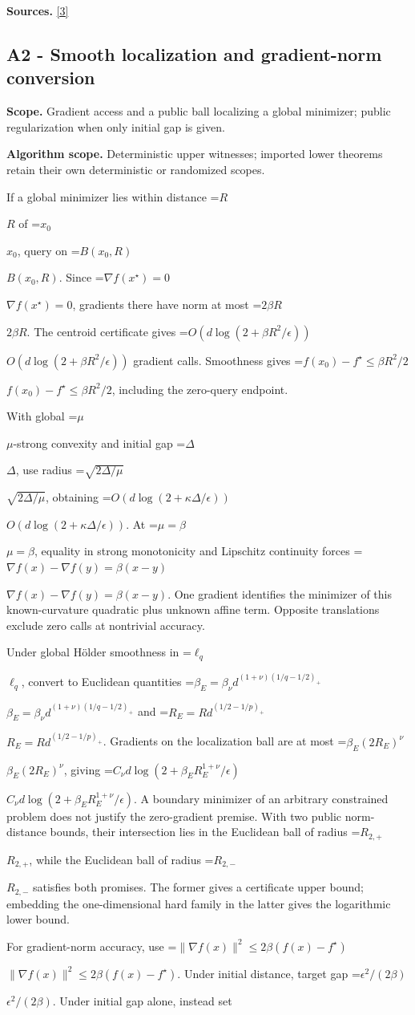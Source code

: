 \documentclass[10pt,a4paper]{article}
\newcommand{\AtlasMath}[1]{\par\begingroup\centering\setbox0=\hbox{$\displaystyle #1$}\ifdim\wd0>1.4\linewidth\typeout{ATLAS WIDE FORMULA: \the\wd0}\fi\ifdim\wd0>\linewidth\resizebox{\linewidth}{!}{\box0}\else\box0\fi\par\endgroup}
\newcommand{\AtlasInlineMath}[1]{\begingroup\setbox0=\hbox{$#1$}\ifdim\wd0>.4\linewidth\endgroup\AtlasMath{#1}\else\endgroup$#1$\fi}
\begin{document}
\textbf{Sources.} \href{https://arxiv.org/pdf/1405.4980}{[3]}

\subsection{A2 - Smooth localization and gradient-norm conversion}
\textbf{Scope.} Gradient access and a public ball localizing a global minimizer; public regularization when only initial gap is given.

\textbf{Algorithm scope.} Deterministic upper witnesses; imported lower theorems retain their own deterministic or randomized scopes.

If a global minimizer lies within distance \AtlasInlineMath{R} of \AtlasInlineMath{x_0}, query on \AtlasInlineMath{B(x_0,R)}. Since \AtlasInlineMath{\nabla f(x^\star)=0}, gradients there have norm at most \AtlasInlineMath{2\beta R}. The centroid certificate gives \AtlasInlineMath{O(d\log(2+\beta R^2/\epsilon))} gradient calls. Smoothness gives \AtlasInlineMath{f(x_0)-f^\star\le\beta R^2/2}, including the zero-query endpoint.

With global \AtlasInlineMath{\mu}-strong convexity and initial gap \AtlasInlineMath{\Delta}, use radius \AtlasInlineMath{\sqrt{2\Delta/\mu}}, obtaining \AtlasInlineMath{O(d\log(2+\kappa\Delta/\epsilon))}. At \AtlasInlineMath{\mu=\beta}, equality in strong monotonicity and Lipschitz continuity forces \AtlasInlineMath{\nabla f(x)-\nabla f(y)=\beta(x-y)}. One gradient identifies the minimizer of this known-curvature quadratic plus unknown affine term. Opposite translations exclude zero calls at nontrivial accuracy.

Under global Hölder smoothness in \AtlasInlineMath{\ell_q}, convert to Euclidean quantities
\AtlasInlineMath{\beta_E=\beta_\nu d^{(1+\nu)(1/q-1/2)_+}} and
\AtlasInlineMath{R_E=Rd^{(1/2-1/p)_+}}. Gradients on the localization ball are at most \AtlasInlineMath{\beta_E(2R_E)^\nu}, giving
\AtlasInlineMath{C_\nu d\log(2+\beta_E R_E^{1+\nu}/\epsilon)}.
A boundary minimizer of an arbitrary constrained problem does not justify the zero-gradient premise. With two public norm-distance bounds, their intersection lies in the Euclidean ball of radius \AtlasInlineMath{R_{2,+}}, while the Euclidean ball of radius \AtlasInlineMath{R_{2,-}} satisfies both promises. The former gives a certificate upper bound; embedding the one-dimensional hard family in the latter gives the logarithmic lower bound.

For gradient-norm accuracy, use \AtlasInlineMath{\|\nabla f(x)\|^2\le2\beta(f(x)-f^\star)}. Under initial distance, target gap \AtlasInlineMath{\epsilon^2/(2\beta)}. Under initial gap alone, instead set
\end{document}
